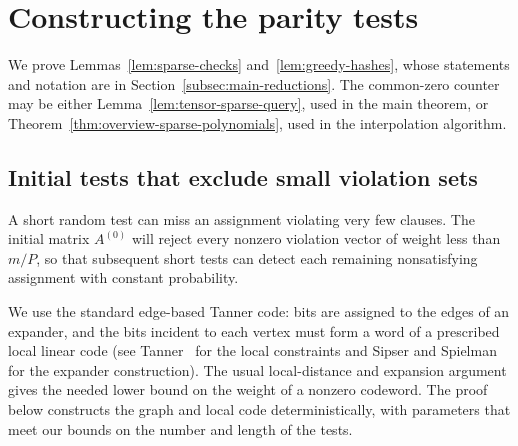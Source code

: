 \section{Constructing the parity tests}\label{sec:hashes}\label{subsec:sparse-hashes}
We prove Lemmas~\ref{lem:sparse-checks} and~\ref{lem:greedy-hashes},
whose statements and notation are in Section~\ref{subsec:main-reductions}.
The common-zero counter may be either Lemma~\ref{lem:tensor-sparse-query}, used in
the main theorem, or Theorem~\ref{thm:overview-sparse-polynomials}, used
in the interpolation algorithm.

\subsection{Initial tests that exclude small violation sets}

A short random test can miss an assignment violating very few
clauses. The initial matrix $A^{(0)}$ will reject every nonzero
violation vector of weight less than $m/P$, so that subsequent
short tests can detect each remaining nonsatisfying
assignment with constant probability.

We use the standard edge-based Tanner code: bits are assigned to
the edges of an expander, and the bits incident to each vertex
must form a word of a prescribed local linear code
(see
Tanner~\cite[Section~II]{Tanner81} for the local constraints and
Sipser and Spielman~\cite[Sections~IV and~VI]{SS96} for the expander construction).
The usual local-distance and expansion argument gives the needed
lower bound on the weight of a nonzero codeword. The proof below
constructs the graph and local code deterministically, with parameters
that meet our bounds on the number and length of the tests.


